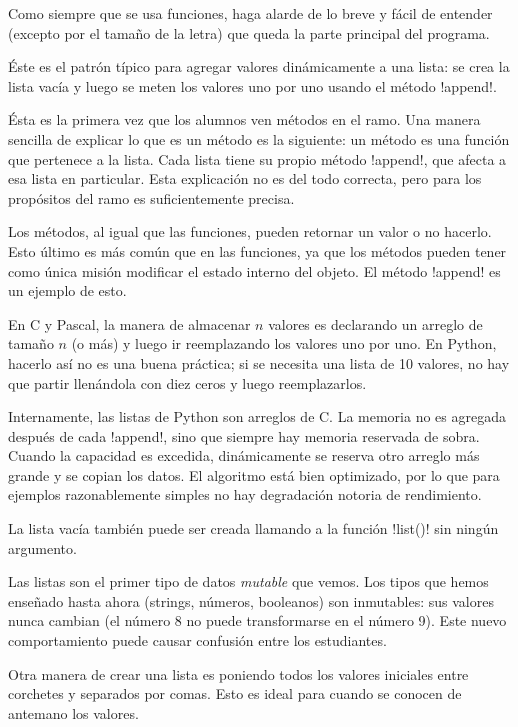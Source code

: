 \documentclass[10pt]{article}
\begin{document}
  Como siempre que se usa funciones,
  haga alarde de lo breve y fácil de entender (excepto por el tamaño de la letra)
  que queda la parte principal del programa.


  Éste es el patrón típico para agregar valores dinámicamente a una lista:
  se crea la lista vacía y luego se meten los valores uno por uno
  usando el método \li!append!.

  Ésta es la primera vez que los alumnos ven métodos en el ramo.
  Una manera sencilla de explicar lo que es un método es la siguiente:
  un método es una función que pertenece a la lista.
  Cada lista tiene su propio método \li!append!,
  que afecta a esa lista en particular.
  Esta explicación no es del todo correcta,
  pero para los propósitos del ramo es suficientemente precisa.

  Los métodos, al igual que las funciones,
  pueden retornar un valor o no hacerlo.
  Esto último es más común que en las funciones,
  ya que los métodos pueden tener como única misión
  modificar el estado interno del objeto.
  El método \li!append! es un ejemplo de esto.

  En C y Pascal,
  la manera de almacenar \(n\) valores es declarando un arreglo de tamaño \(n\) (o más)
  y luego ir reemplazando los valores uno por uno.
  En Python,
  hacerlo así no es una buena práctica;
  si se necesita una lista de 10 valores,
  no hay que partir llenándola con diez ceros y luego reemplazarlos.

  Internamente,
  las listas de Python son arreglos de C.
  La memoria no es agregada después de cada \li!append!,
  sino que siempre hay memoria reservada de sobra.
  Cuando la capacidad es excedida,
  dinámicamente se reserva otro arreglo más grande y se copian los datos.
  El algoritmo está bien optimizado,
  por lo que para ejemplos razonablemente simples
  no hay degradación notoria de rendimiento.

  La lista vacía también puede ser creada
  llamando a la función \li!list()! sin ningún argumento.

  Las listas son el primer tipo de datos \emph{mutable} que vemos.
  Los tipos que hemos enseñado hasta ahora (strings, números, booleanos)
  son inmutables: sus valores nunca cambian (el número 8 no puede transformarse en el número 9).
  Este nuevo comportamiento puede causar confusión entre los estudiantes.


  Otra manera de crear una lista
  es poniendo todos los valores iniciales entre corchetes
  y separados por comas.
  Esto es ideal para cuando se conocen de antemano los valores.
\end{document}

